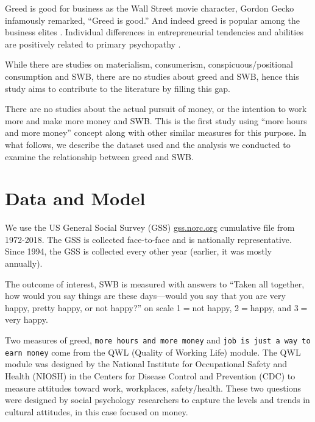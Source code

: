 \documentclass[10pt, letterpaper]{article}
\begin{document}
\begin{spacing}{1.8}


Greed is good for business as the Wall Street movie
 character, Gordon Gecko infamously remarked, ``Greed is good.'' And indeed greed is popular among the business elites \citep{robinson2009greed}.
Individual differences in entrepreneurial tendencies
and abilities are positively related to primary psychopathy \citep{akhtar2013greed} %
 \citep{feherrelationship}.

While there are studies on materialism, consumerism,
conspicuous/positional consumption and SWB, there are no studies about  %
greed %
and SWB, hence this study aims to contribute to the literature by filling this gap. 

There are no studies about the actual pursuit of money, or the intention to work
more and make more money and SWB. This is the first study using ``more hours and
more money'' concept along with other similar measures for this purpose. In what follows, we describe the dataset used and the analysis we conducted to examine the relationship between greed and SWB. 


\section{Data and Model}

We use the US General Social Survey (GSS) \url{gss.norc.org} cumulative file from
1972-2018. The GSS is collected face-to-face and is nationally
representative. Since 1994, the GSS is collected every other year (earlier, it was mostly annually).

The outcome of interest, SWB is measured with answers to ``Taken all together, how would you say things are these days---would you say that you are very happy,
pretty happy, or not happy?'' on scale  1$=$not happy, 2$=$happy, and 3$=$very happy. 

Two measures of greed, \texttt{more hours and more money} and  \texttt{job is just a way to earn money} come from the QWL (Quality of Working Life) module. The QWL module was designed by the National Institute for Occupational Safety and Health (NIOSH) in the Centers for Disease Control and Prevention (CDC) to measure attitudes toward work, workplaces,
safety/health. These two questions  were designed by social psychology researchers to capture the levels and trends in cultural attitudes, in this case focused on money. 


\end{spacing}
\end{document}
